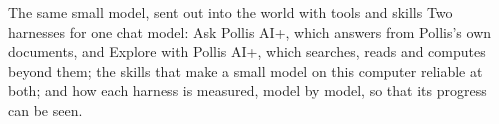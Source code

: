 

\usepackage{titlesec}
\usepackage{tabularx}
\usepackage{booktabs}
\usepackage{listings}

\fancyhf{}
\fancyfoot[R]{\footnotesize\color{soft}\thepage}

\titleformat{\section}{\color{navy}\large\bfseries}{\color{deepamber}\thesection}{0.6em}{}
\titleformat{\subsection}{\color{navy}\normalsize\bfseries}{\color{deepamber}\thesubsection}{0.5em}{}
\titlespacing*{\section}{0pt}{12pt}{4pt}
\titlespacing*{\subsection}{0pt}{8pt}{2pt}
\setlength{\parskip}{4pt}


\usepackage{xurl}
\newcommand{\file}[1]{{\small\nolinkurl{#1}}}



  {The same small model, sent out into the world with tools and skills}
  {Two harnesses for one chat model: Ask Pollis AI+, which answers from Pollis's own documents, and Explore with
   Pollis AI+, which searches, reads and computes beyond them; the skills that make a small model on this computer
   reliable at both; and how each harness is measured, model by model, so that its progress can be seen.}

